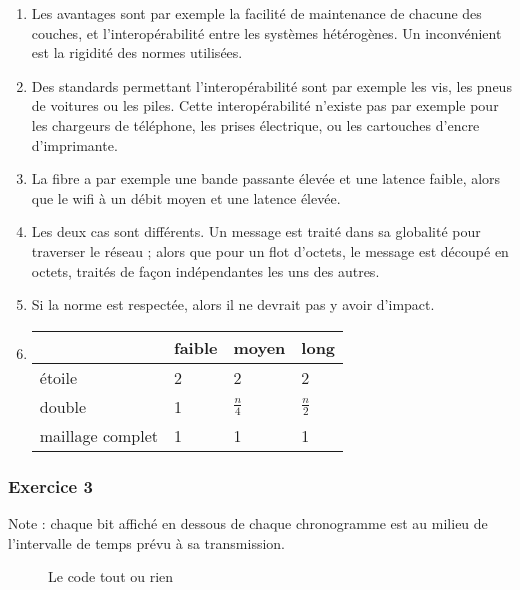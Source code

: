 \begin{enumerate}
	\item Les avantages sont par exemple la facilité de maintenance de chacune des couches, et l'interopérabilité entre les systèmes hétérogènes. Un inconvénient est la rigidité des normes utilisées.
	\item Des standards permettant l'interopérabilité sont par exemple les vis, les pneus de voitures ou les piles. Cette interopérabilité n'existe pas par exemple pour les chargeurs de téléphone, les prises électrique, ou les cartouches d'encre d'imprimante.
	\item La fibre a par exemple une bande passante élevée et une latence faible, alors que le wifi à un débit moyen et une latence élevée.
	\item Les deux cas sont différents. Un message est traité dans sa globalité pour traverser le réseau ; alors que pour un flot d'octets, le message est découpé en octets, traités de façon indépendantes les uns des autres.
	\item Si la norme est respectée, alors il ne devrait pas y avoir d'impact.
	\item
		\begin{tabular}[t]{|l|l|l|l|}
\hline
 & faible & moyen & long \\ \hline
étoile & 2 & 2 & 2 \\ \hline
double & 1 & $\frac{n}{4}$ & $\frac{n}{2}$ \\ \hline
maillage complet & 1 & 1 & 1 \\ \hline
\end{tabular}
\end{enumerate}

\subsubsection{Exercice 3}

Note : chaque bit affiché en dessous de chaque chronogramme est au milieu de l'intervalle de temps prévu à sa transmission.

\begin{figure}[H]
\centering
{}
\caption{Le code tout ou rien}
\end{figure}


